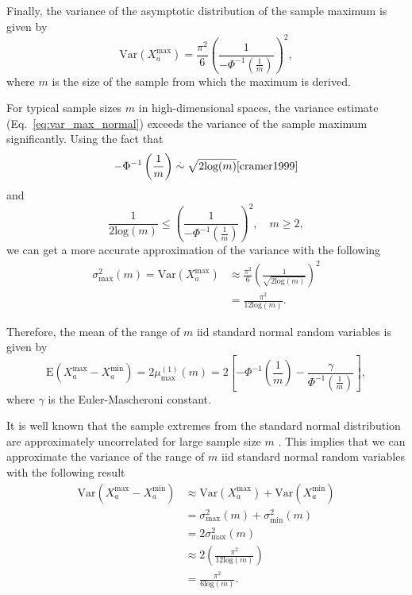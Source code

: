 \documentclass[aoas]{imsart}
\begin{document}
Finally, the variance of the asymptotic distribution of the sample maximum is given by
%
\begin{equation}\label{eq:var_max_normal}
\text{Var}(X^\text{max}_a) = \frac{\pi^2}{6}\left(\frac{1}{-\Phi^{-1}\left(\frac{1}{m}\right)}\right)^2,
\end{equation}
%
where $m$ is the size of the sample from which the maximum is derived.

For typical sample sizes $m$ in high-dimensional spaces, the variance estimate (Eq.~\ref{eq:var_max_normal}) exceeds the variance of the sample maximum significantly. Using the fact that
%
\[
-\Phi^{-1}\left(\frac{1}{m}\right) \overset{.}{\sim} \sqrt{2 \text{log}(m)} \text{\cite{cramer1999}}
\] 
%
and 
%
\[
\frac{1}{2 \text{log}(m)} \leq \left(\frac{1}{-\Phi^{-1}\left(\frac{1}{m}\right)}\right)^2, \quad m \geq 2,
\] 
%
we can get a more accurate approximation of the variance with the following
%
\begin{equation}\label{eq:var_max_normal_improved}
\begin{aligned}
\sigma^2_\text{max}(m) = \text{Var}(X^\text{max}_a) &\approx \frac{\pi^2}{6}\left(\frac{1}{\sqrt{2\text{log}(m)}}\right)^2 \\
&= \frac{\pi^2}{12\text{log}(m)}.
\end{aligned}
\end{equation}

Therefore, the mean of the range of $m$ iid standard normal random variables is given by
%
\begin{equation}\label{eq:mu_rng_normal}
\text{E}(X^\text{max}_a - X^\text{min}_a) = 2\mu^{(1)}_\text{max}(m) = 2\left[-\Phi^{-1} \left(\frac{1}{m}\right) - \frac{\gamma}{\Phi^{-1}\left(\frac{1}{m}\right)}\right],
\end{equation}
%
where $\gamma$ is the Euler-Mascheroni constant.

It is well known that the sample extremes from the standard normal distribution are approximately uncorrelated for large sample size $m$ \cite{gumbel1947}. This implies that we can approximate the variance of the range of $m$ iid standard normal random variables with the following result
%
\begin{equation}\label{eq:var_rng_normal}
\begin{aligned}
\text{Var}(X^\text{max}_a - X^\text{min}_a) &\approx \text{Var}(X^\text{max}_a) + \text{Var}(X^\text{min}_a) \\
&= \sigma^2_\text{max}(m) + \sigma^2_\text{min}(m) \\
&= 2\sigma^2_\text{max}(m) \\
&\approx 2\left(\frac{\pi^2}{12\text{log}(m)}\right) \\
&= \frac{\pi^2}{6\text{log}(m)}.
\end{aligned}
\end{equation}
\end{document}
